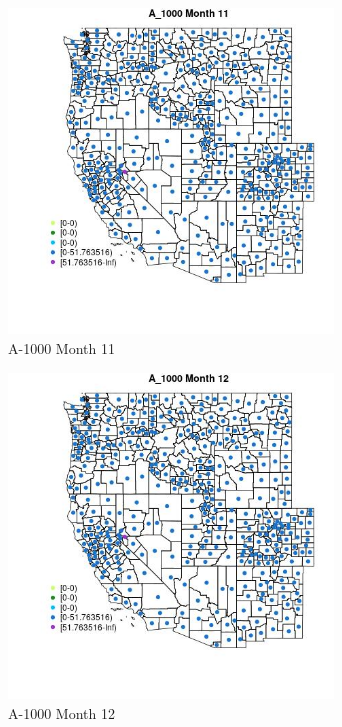 \begin{figure} 
\centering  
\includegraphics[width=0.77\textwidth]{Code_Outputs/df_report_ML_predictors_CountyCentroid_Locations_Dates_2008-01-01to2018-12-31_MapObsMo11A_1000.jpg} 
\caption{\label{fig:df_report_ML_predictors_CountyCentroid_Locations_Dates_2008-01-01to2018-12-31MapObsMo11A_1000}A-1000 Month 11} 
\end{figure} 
 

\begin{figure} 
\centering  
\includegraphics[width=0.77\textwidth]{Code_Outputs/df_report_ML_predictors_CountyCentroid_Locations_Dates_2008-01-01to2018-12-31_MapObsMo12A_1000.jpg} 
\caption{\label{fig:df_report_ML_predictors_CountyCentroid_Locations_Dates_2008-01-01to2018-12-31MapObsMo12A_1000}A-1000 Month 12} 
\end{figure} 
 

